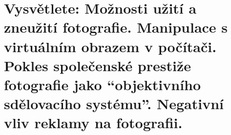 \section{Vysvětlete: Možnosti užití a zneužití fotografie. Manipulace s virtuálním obrazem v počítači. Pokles 
společenské prestiže fotografie jako \enquote{objektivního sdělovacího systému}. Negativní vliv reklamy na fotografii.}